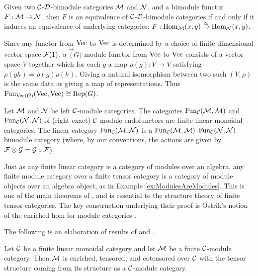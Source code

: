 \documentclass{amsart}
\begin{document}
\begin{lemma} \label{lem:Recog_equiv_of_bimod}
	Given two $\cC$-$\cD$-bimodule categories $\cM$ and $\cN$, and a bimodule functor $F:\cM \to \cN$, then $F$ is an equivalence of $\cC$-$\cD$-bimodule categories if and only if it induces an equivalence of underlying categories: $F: \Hom_{\cM}(x,y) \stackrel{\simeq}{\to} \Hom_{\cN}(x,y)$. 
\end{lemma}

\begin{example}
Since any functor from $\Vec$ to $\Vec$ is determined by a choice of finite dimensional vector space $\cF(1)$, a $\Vec(G)$-module functor from $\Vec$ to $\Vec$ consists of a vector space $V$ together which for each $g$ a map $\rho(g): V \rightarrow V$ satisfying $\rho(gh) = \rho(g)\rho(h)$.  Giving a natural isomorphism between two such $(V, \rho)$ is the same data as giving a map of representations.  Thus $\Fun_{\Vec(G)}(\Vec, \Vec) \cong \Rep(G)$.
\end{example}

\begin{example}
	Let $\cM$ and $\cN$ be left $\cC$-module categories. The categories $\Fun_{\cC}(\cM, \cM)$ and $\Fun_{\cC}(\cN, \cN)$ of (right exact) $\cC$-module endofunctors are finite linear monoidal categories. The linear category $\Fun_{\cC}(\cM, \cN)$ is a $\Fun_{\cC}(\cM, \cM)$-$\Fun_{\cC}(\cN, \cN)$-bimodule category (where, by our conventions, the actions are given by $\cF \otimes \cG = \cG \circ \cF$). 
\end{example}

Just as any finite linear category is a category of modules over an algebra, any finite module category over a finite tensor category is a category of module objects over an algebra object, as in Example \ref{ex:ModulesAreModules}.  This is one of the main theorems of \cite{EGNO}, and is essential to the structure theory of finite tensor categories.  The key construction underlying their proof is Ostrik's notion of the enriched hom for module categories \cite{MR1976459}.  

The following is an elaboration of results of \cite{MR1976459} and \cite{EO-ftc}. %
\begin{proposition} \label{thm:enrichment-of-mod-cats}
	Let $\cC$ be a finite linear monoidal category and let $\cM$ be a finite $\cC$-module category. Then $\cM$ is enriched, tensored, and cotensored over $\cC$ with the tensor structure coming from its structure as a $\cC$-module category.
\end{proposition}
\end{document}
